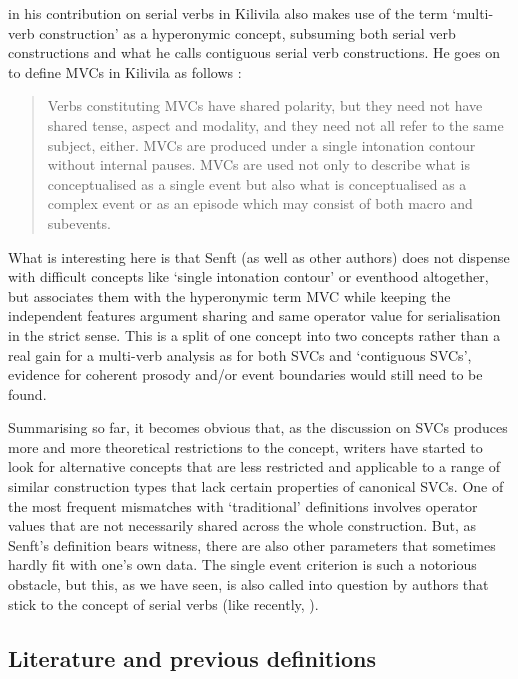 \citet{senft2008event} in his contribution on serial verbs in Kilivila also makes use of the term `multi-verb construction' as a hyperonymic concept, subsuming both serial verb constructions and what he calls contiguous serial verb constructions. He goes on to define MVCs in Kilivila as follows \citep[10]{senft2008event}: 

\begin{quote}Verbs constituting MVCs have shared polarity, but they need not have shared tense, aspect and modality, and they need not all refer to the same subject, either. MVCs are produced under a single intonation contour without internal pauses. MVCs are used not only to describe what is conceptualised as a single event but also what is conceptualised as a complex event or as an episode which may consist of both macro and subevents.\end{quote}

What is interesting here is that Senft (as well as other authors) does not dispense with difficult concepts like `single intonation contour' or eventhood altogether, but associates them with the hyperonymic term MVC while keeping the independent features argument sharing and same operator value for serialisation in the strict sense. This is a split of one concept into two concepts rather than a real gain for a multi-verb analysis as for both SVCs and `contiguous SVCs', evidence for coherent prosody and/or event boundaries would still need to be found.

Summarising so far, it becomes obvious that, as the discussion on SVCs produces more and more theoretical restrictions to the concept, writers have started to look for alternative concepts that are less restricted and applicable to a range of similar construction types that lack certain properties of canonical SVCs. One of the most frequent mismatches with `traditional' definitions involves operator values that are not necessarily shared across the whole construction. But, as Senft's definition bears witness, there are also other parameters that sometimes hardly fit with one's own data. The single event criterion is such a notorious obstacle, but this, as we have seen, is also called into question by authors that stick to the concept of serial verbs (like recently, \citealt{haspelmath2016serial}). 

\subsection{Literature and previous definitions} \label{sec:literature-mvcs}

